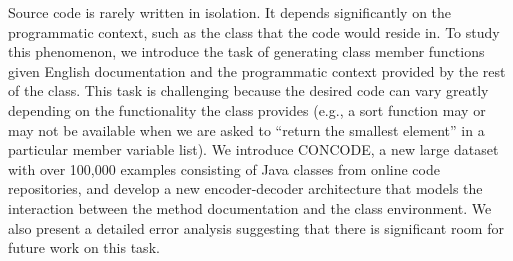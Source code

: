 Source code is rarely written in isolation. It depends significantly on the programmatic context, such as the class that the code would reside in. To study this phenomenon, we introduce the task of generating class member functions given English documentation and the programmatic context provided by the rest of the class. This task is challenging because the desired code can vary greatly depending on the functionality the class provides (e.g., a sort function may or may not be available when we are asked to ``return the smallest element'' in a particular member variable list). We introduce CONCODE, a new large dataset with over 100,000 examples consisting of Java classes from online code repositories, and develop a new encoder-decoder architecture that models the interaction between the method documentation and the class environment. We also present a detailed error analysis suggesting that there is significant room for future work on this task.
